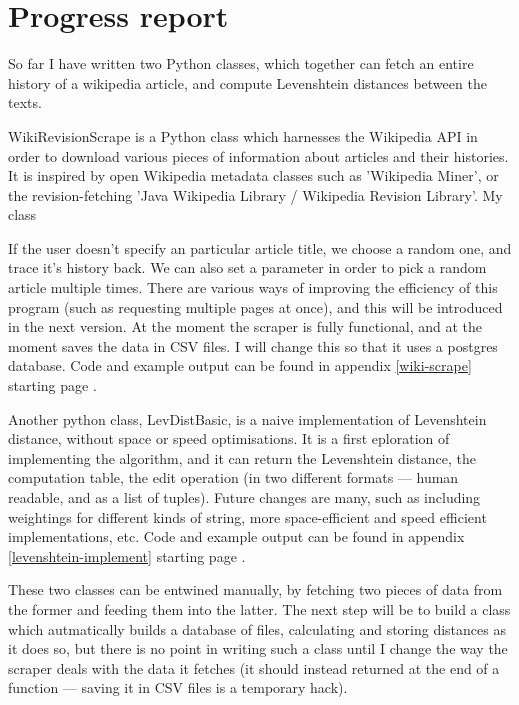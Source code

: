 \documentclass[a4paper,11pt,twoside,notitlepage]{article}
\begin{document}
        \section{Progress report}
        So far I have written two Python classes, which together
        can fetch an entire history of a wikipedia article, and
        compute Levenshtein distances between the texts.

        WikiRevisionScrape is a Python class which harnesses the
        Wikipedia API in order to download various pieces of
        information about articles and their histories. It is inspired
        by open Wikipedia metadata classes such as 'Wikipedia
        Miner'\cite{wiki-miner}, or the revision-fetching 'Java
        Wikipedia Library / Wikipedia Revision
        Library'.\cite{wiki-java}\cite{Ferschke2011} My class 

        If the user doesn't specify an particular article title, we
        choose a random one, and trace it's history back. We can also
        set a parameter in order to pick a random article multiple
        times. There are various ways of improving the efficiency of
        this program (such as requesting multiple pages at once), and
        this will be introduced in the next version. At the moment the
        scraper is fully functional, and at the moment saves the data
        in CSV files. I will change this so that it uses a postgres
        database. Code and example output can be found in appendix
        \ref{wiki-scrape} starting page \pageref{wiki-scrape}.

        Another python class, LevDistBasic, is a naive implementation
        of Levenshtein distance, without space or speed
        optimisations. It is a first eploration of implementing the
        algorithm, and it can return the Levenshtein distance, the
        computation table, the edit operation (in two different
        formats --- human readable, and as a list of tuples). Future
        changes are many, such as including weightings for different
        kinds of string, more space-efficient and speed efficient
        implementations, etc. Code and example output can be found in
        appendix \ref{levenshtein-implement} starting page
        \pageref{levenshtein-implement}. 

        These two classes can be entwined manually, by fetching two
        pieces of data from the former and feeding them into the
        latter. The next step will be to build a class which
        autmatically builds a database of files, calculating and storing
        distances as it does so, but there is no point in writing such
        a class until I change the way the scraper deals with the data
        it fetches (it should instead returned at the end of a
        function --- saving it in CSV files is a temporary hack).
\end{document}
